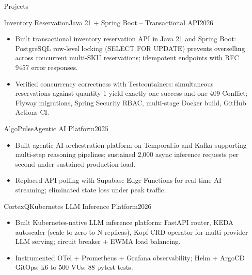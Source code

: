 \documentclass[]{mcdowellcv}
\begin{document}
\begin{cvsection}{Projects}
  \begin{cvsubsection}{Inventory Reservation}{Java 21 + Spring Boot -- Transactional API}{2026}
    \begin{itemize}
      \item Built transactional inventory reservation API in Java 21 and Spring Boot: PostgreSQL row-level locking (SELECT FOR UPDATE) prevents overselling across concurrent multi-SKU reservations; idempotent endpoints with RFC 9457 error responses.
      \item Verified concurrency correctness with Testcontainers: simultaneous reservations against quantity 1 yield exactly one success and one 409 Conflict; Flyway migrations, Spring Security RBAC, multi-stage Docker build, GitHub Actions CI.
    \end{itemize}
    \vspace{-1.5pt}
  \end{cvsubsection}

  \begin{cvsubsection}{AlgoPulse}{Agentic AI Platform}{2025}
    \begin{itemize}
      \item Built agentic AI orchestration platform on Temporal.io and Kafka supporting multi-step reasoning pipelines; sustained 2,000 async inference requests per second under sustained production load.
      \item Replaced API polling with Supabase Edge Functions for real-time AI streaming; eliminated state loss under peak traffic.
    \end{itemize}
    \vspace{-1.5pt}
  \end{cvsubsection}

  \begin{cvsubsection}{CortexQ}{Kubernetes LLM Inference Platform}{2026}
    \begin{itemize}
      \item Built Kubernetes-native LLM inference platform: FastAPI router, KEDA autoscaler (scale-to-zero to N replicas), Kopf CRD operator for multi-provider LLM serving; circuit breaker + EWMA load balancing.
      \item Instrumented OTel + Prometheus + Grafana observability; Helm + ArgoCD GitOps; k6 to 500 VUs; 88 pytest tests.
    \end{itemize}
    \vspace{-1.5pt}
  \end{cvsubsection}


\end{cvsection}
\end{document}
